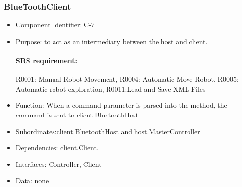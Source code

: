 \documentclass[11pt, a4paper]{report}
\begin{document}
\subsubsection{BlueToothClient}
\begin{itemize}
\item Component Identifier: C-7
\item Purpose: to act as an intermediary between the host and client.
\paragraph{SRS requirement:}R0001: Manual Robot Movement, R0004: Automatic Move Robot,
R0005: Automatic robot exploration, R0011:Load and Save XML Files
\item Function: When a command parameter is parsed into the method, the command is sent to
client.BluetoothHost.
\item Subordinates:client.BluetoothHost and host.MasterController
\item Dependencies: client.Client.
\item Interfaces: Controller, Client
\item Data: none
\end{itemize}
\end{document}
